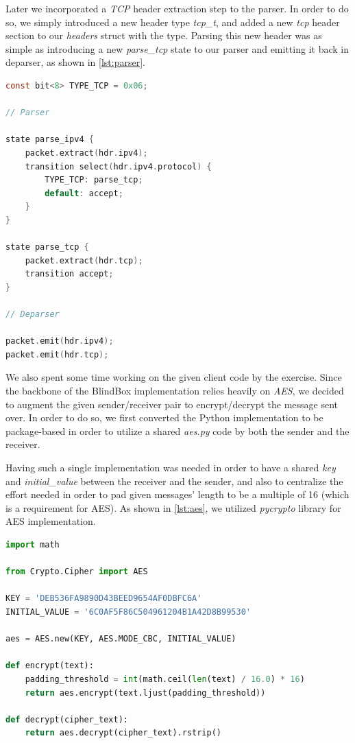 \documentclass{winslabreport}
\begin{document}
Later we incorporated a \emph{TCP} header extraction step to the parser. In order to do so, we simply introduced a new header type \emph{tcp\_t}, and added a new \emph{tcp} header section to our \emph{headers} struct with the type. Parsing this new header was as simple as introducing a new \emph{parse\_tcp} state to our parser and emitting it back in deparser, as shown in \ref{lst:parser}.

\begin{lstlisting}[caption={P4 parser snippet},label={lst:parser},language=C]
const bit<8> TYPE_TCP = 0x06;

// Parser

state parse_ipv4 {
    packet.extract(hdr.ipv4);
    transition select(hdr.ipv4.protocol) {
        TYPE_TCP: parse_tcp;
        default: accept;
    }
}

state parse_tcp {
    packet.extract(hdr.tcp);
    transition accept;
}

// Deparser

packet.emit(hdr.ipv4);
packet.emit(hdr.tcp);
\end{lstlisting}

We also spent some time working on the given client code by the exercise. Since the backbone of the BlindBox implementation relies heavily on \emph{AES}, we decided to augment the given sender/receiver pair to encrypt/decrypt the message sent over. In order to do so, we first converted the Python implementation to be package-based in order to utilize a shared \emph{aes.py} code by both the sender and the receiver. 

Having such a single implementation was needed in order to have a shared \emph{key} and \emph{initial\_value} between the receiver and the sender, and also to centralize the effort needed in order to pad given messages' length to be a multiple of 16 (which is a requirement for AES). As shown in \ref{lst:aes}, we utilized \emph{pycrypto} library for AES implementation.

\begin{lstlisting}[caption={AES encryption/decryption},label={lst:aes},language=Python]
import math

from Crypto.Cipher import AES

KEY = 'DEB536FA9890D43BEED9654AF0DBFC6A'
INITIAL_VALUE = '6C0AF5F86C504961204B1A42D8B99530'

aes = AES.new(KEY, AES.MODE_CBC, INITIAL_VALUE)

def encrypt(text):
    padding_threshold = int(math.ceil(len(text) / 16.0) * 16)
    return aes.encrypt(text.ljust(padding_threshold))

def decrypt(cipher_text):
    return aes.decrypt(cipher_text).rstrip()
\end{lstlisting}
\end{document}
